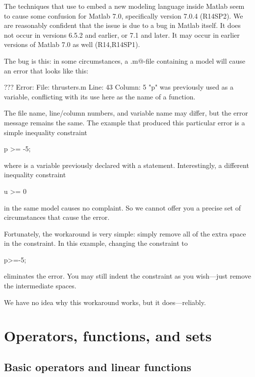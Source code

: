 \documentclass[12pt]{article}
\begin{document}
The techniques that \cvx use to embed a new modeling language inside Matlab
seem to cause some confusion for Matlab 7.0, specifically version 7.0.4 (R14SP2). 
We are reasonably confident
that the issue is due to a bug in Matlab itself. It does not occur in versions
6.5.2 and earlier, or 7.1 and later. It may occur in earlier versions of
Matlab 7.0 as well (R14,R14SP1).

The bug is this: in  some circumstances, a \verb@.m@-file containing a \cvx model will cause
an error that looks like this:
\begin{code}
	??? Error: File: thrusters.m Line: 43 Column: 5
	"p" was previously used as a variable,
	conflicting with its use here as the name of a function.
\end{code}
The file name, line/column numbers, and variable name may differ, 
but the error message remains the same. The example that produced this particular 
error is a simple inequality constraint
\begin{code}
	p >= -5;
\end{code}
where \verb@p@ is a \cvx variable previously declared with a \verb@variable@ statement.
Interestingly, a different inequality constraint
\begin{code}
	u >= 0
\end{code}
in the same model causes no complaint. So we cannot offer you a precise set
of circumstances that cause the error.

Fortunately, the workaround is very simple: simply remove all of the extra space
in the constraint. In this example, changing the constraint to
\begin{code}
	p>=-5;
\end{code}
eliminates the error. You may still indent the constraint as you wish---just
remove the intermediate spaces.

We have no idea why this workaround works, but it does---reliably.

\section{Operators, functions, and sets}
\label{s-functions}

\subsection{Basic operators and linear functions}
\end{document}
